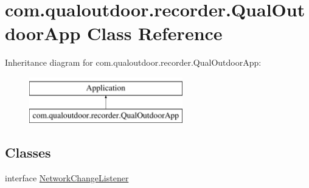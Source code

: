 \hypertarget{classcom_1_1qualoutdoor_1_1recorder_1_1QualOutdoorApp}{\section{com.\-qualoutdoor.\-recorder.\-Qual\-Outdoor\-App Class Reference}
\label{classcom_1_1qualoutdoor_1_1recorder_1_1QualOutdoorApp}
}
Inheritance diagram for com.\-qualoutdoor.\-recorder.\-Qual\-Outdoor\-App\-:\begin{figure}[H]
\begin{center}
\leavevmode
\includegraphics[height=2.000000cm]{classcom_1_1qualoutdoor_1_1recorder_1_1QualOutdoorApp}
\end{center}
\end{figure}
\subsection*{Classes}
\begin{DoxyCompactItemize}
\item 
interface \hyperlink{interfacecom_1_1qualoutdoor_1_1recorder_1_1QualOutdoorApp_1_1NetworkChangeListener}{Network\-Change\-Listener}
\end{DoxyCompactItemize}
